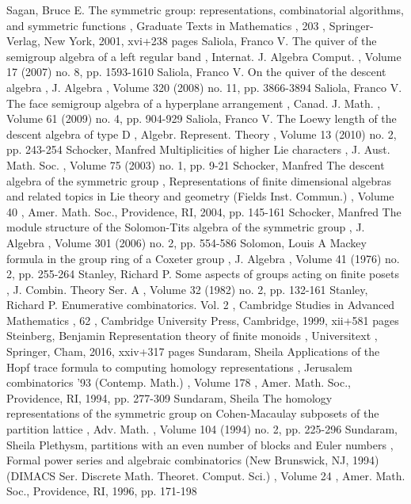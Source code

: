  Sagan, Bruce E. The symmetric group: representations, combinatorial algorithms, and symmetric functions , Graduate Texts in Mathematics , 203 , Springer-Verlag, New York, 2001, xvi+238 pages
 Saliola, Franco V. The quiver of the semigroup algebra of a left regular band , Internat. J. Algebra Comput. , Volume 17 (2007) no. 8, pp. 1593-1610
 Saliola, Franco V. On the quiver of the descent algebra , J. Algebra , Volume 320 (2008) no. 11, pp. 3866-3894
 Saliola, Franco V. The face semigroup algebra of a hyperplane arrangement , Canad. J. Math. , Volume 61 (2009) no. 4, pp. 904-929
 Saliola, Franco V. The Loewy length of the descent algebra of type D , Algebr. Represent. Theory , Volume 13 (2010) no. 2, pp. 243-254
 Schocker, Manfred Multiplicities of higher Lie characters , J. Aust. Math. Soc. , Volume 75 (2003) no. 1, pp. 9-21
 Schocker, Manfred The descent algebra of the symmetric group , Representations of finite dimensional algebras and related topics in Lie theory and geometry (Fields Inst. Commun.) , Volume 40 , Amer. Math. Soc., Providence, RI, 2004, pp. 145-161
 Schocker, Manfred The module structure of the Solomon-Tits algebra of the symmetric group , J. Algebra , Volume 301 (2006) no. 2, pp. 554-586
 Solomon, Louis A Mackey formula in the group ring of a Coxeter group , J. Algebra , Volume 41 (1976) no. 2, pp. 255-264
 Stanley, Richard P. Some aspects of groups acting on finite posets , J. Combin. Theory Ser. A , Volume 32 (1982) no. 2, pp. 132-161
 Stanley, Richard P. Enumerative combinatorics. Vol. 2 , Cambridge Studies in Advanced Mathematics , 62 , Cambridge University Press, Cambridge, 1999, xii+581 pages
 Steinberg, Benjamin Representation theory of finite monoids , Universitext , Springer, Cham, 2016, xxiv+317 pages
 Sundaram, Sheila Applications of the Hopf trace formula to computing homology representations , Jerusalem combinatorics ’93 (Contemp. Math.) , Volume 178 , Amer. Math. Soc., Providence, RI, 1994, pp. 277-309
 Sundaram, Sheila The homology representations of the symmetric group on Cohen-Macaulay subposets of the partition lattice , Adv. Math. , Volume 104 (1994) no. 2, pp. 225-296
 Sundaram, Sheila Plethysm, partitions with an even number of blocks and Euler numbers , Formal power series and algebraic combinatorics (New Brunswick, NJ, 1994) (DIMACS Ser. Discrete Math. Theoret. Comput. Sci.) , Volume 24 , Amer. Math. Soc., Providence, RI, 1996, pp. 171-198
